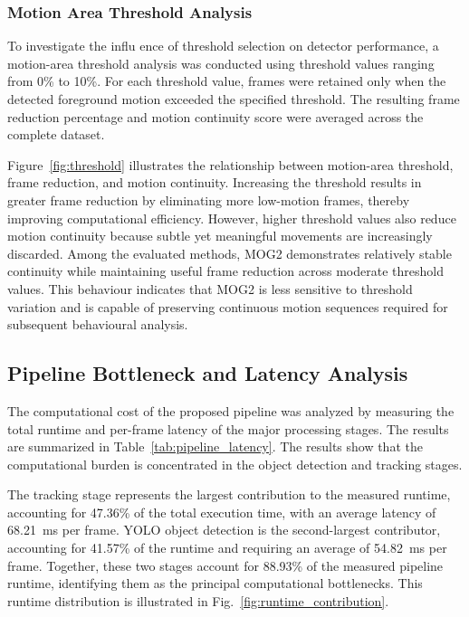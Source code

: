 \documentclass[conference]{IEEEtran}
\begin{document}
\subsubsection{Motion Area Threshold Analysis}

To investigate the influ
ence of threshold selection on detector performance, a motion-area threshold analysis was conducted using threshold values ranging from 0\% to 10\%. For each threshold value, frames were retained only when the detected foreground motion exceeded the specified threshold. The resulting frame reduction percentage and motion continuity score were averaged across the complete dataset.


Figure~\ref{fig:threshold} illustrates the relationship between motion-area threshold, frame reduction, and motion continuity. Increasing the threshold results in greater frame reduction by eliminating more low-motion frames, thereby improving computational efficiency. However, higher threshold values also reduce motion continuity because subtle yet meaningful movements are increasingly discarded. Among the evaluated methods, MOG2 demonstrates relatively stable continuity while maintaining useful frame reduction across moderate threshold values. This behaviour indicates that MOG2 is less sensitive to threshold variation and is capable of preserving continuous motion sequences required for subsequent behavioural analysis.



\subsection{Pipeline Bottleneck and Latency Analysis}

The computational cost of the proposed pipeline was analyzed by measuring
the total runtime and per-frame latency of the major processing stages. The results are summarized in Table~\ref{tab:pipeline_latency}. 
The results show that the computational burden is concentrated in the
object detection and tracking stages.

The tracking stage represents the largest contribution to the measured
runtime, accounting for 47.36\% of the total execution time, with an
average latency of 68.21~ms per frame. YOLO object detection is the
second-largest contributor, accounting for 41.57\% of the runtime and
requiring an average of 54.82~ms per frame. Together, these two stages
account for 88.93\% of the measured pipeline runtime, identifying them
as the principal computational bottlenecks. This runtime distribution is illustrated in
Fig.~\ref{fig:runtime_contribution}.
\end{document}
